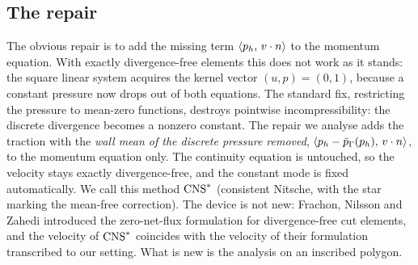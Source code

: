 \subsection{The repair}
The obvious repair is to add the missing term $\langle p_h,\, v\cdot n\rangle$ to the momentum equation. With exactly divergence-free elements this does not work as it stands: the square linear system acquires the kernel vector $(u,p)=(0,1)$, because a constant pressure now drops out of both equations. The standard fix, restricting the pressure to mean-zero functions, destroys pointwise incompressibility: the discrete divergence becomes a nonzero constant. The repair we analyse adds the traction with the \emph{wall mean of the discrete pressure removed}, $\langle p_h-\bar p_{\Gamma}(p_h),\, v\cdot n\rangle$, to the momentum equation only. The continuity equation is untouched, so the velocity stays exactly divergence-free, and the constant mode is fixed automatically. We call this method $\mathrm{CNS}^\ast$ (consistent Nitsche, with the star marking the mean-free correction). The device is not new: Frachon, Nilsson and Zahedi \cite{FrachonNilssonZahedi2024} introduced the zero-net-flux formulation for divergence-free cut elements, and the velocity of $\mathrm{CNS}^\ast$ coincides with the velocity of their formulation transcribed to our setting. What is new is the analysis on an inscribed polygon.

